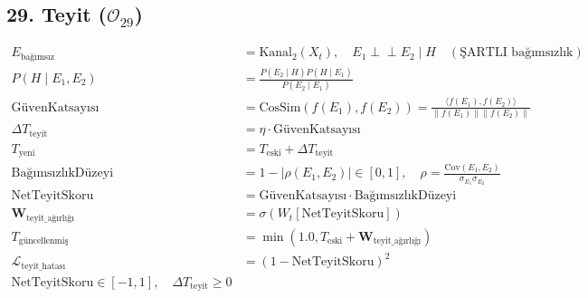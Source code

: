 \documentclass[11pt, a4paper]{article}
\begin{document}
\subsection{29. Teyit ($\mathcal{O}_{29}$)}
\begin{align}
E_{\text{bağımsız}} &= \text{Kanal}_2(X_t), \quad E_1 \perp\!\!\!\perp E_2 \mid H \quad (\text{ŞARTLI bağımsızlık}) \\
P(H \mid E_1, E_2) &= \frac{P(E_2 \mid H) P(H \mid E_1)}{P(E_2 \mid E_1)} \\
\text{GüvenKatsayısı} &= \text{CosSim}(f(E_1), f(E_2)) = \frac{\langle f(E_1), f(E_2) \rangle}{\|f(E_1)\| \|f(E_2)\|} \\
\Delta T_{\text{teyit}} &= \eta \cdot \text{GüvenKatsayısı} \\
T_{\text{yeni}} &= T_{\text{eski}} + \Delta T_{\text{teyit}} \\
\text{BağımsızlıkDüzeyi} &= 1 - |\rho(E_1, E_2)| \in [0,1], \quad \rho = \frac{\text{Cov}(E_1,E_2)}{\sigma_{E_1}\sigma_{E_2}} \\
\text{NetTeyitSkoru} &= \text{GüvenKatsayısı} \cdot \text{BağımsızlıkDüzeyi} \\
\mathbf{W}_{\text{teyit\_ağırlığı}} &= \sigma(W_t [\text{NetTeyitSkoru}]) \\
T_{\text{güncellenmiş}} &= \min(1.0, T_{\text{eski}} + \mathbf{W}_{\text{teyit\_ağırlığı}}) \\
\mathcal{L}_{\text{teyit\_hatası}} &= (1 - \text{NetTeyitSkoru})^2 \\
\text{NetTeyitSkoru} \in [-1, 1], \quad \Delta T_{\text{teyit}} \ge 0
\end{align}
\end{document}
